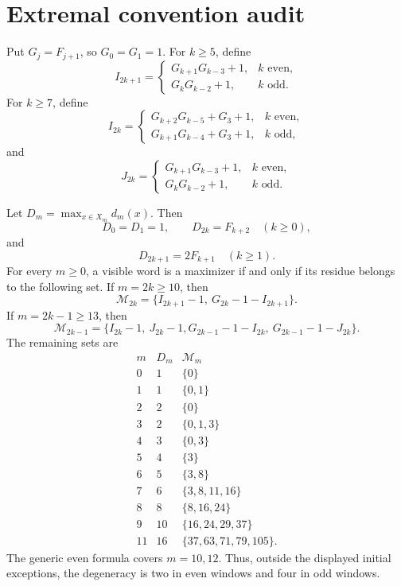 \section{Extremal convention audit}
\label{sec:extremal-audit}

Put \(G_j=F_{j+1}\), so \(G_0=G_1=1\).  For \(k\ge5\), define
\[
 I_{2k+1}=
 \begin{cases}
 G_{k+1}G_{k-3}+1,&k\text{ even},\\
 G_kG_{k-2}+1,&k\text{ odd}.
 \end{cases}
\]
For \(k\ge7\), define
\[
 I_{2k}=
 \begin{cases}
 G_{k+2}G_{k-5}+G_3+1,&k\text{ even},\\
 G_{k+1}G_{k-4}+G_3+1,&k\text{ odd},
 \end{cases}
\]
and
\[
 J_{2k}=
 \begin{cases}
 G_{k+1}G_{k-3}+1,&k\text{ even},\\
 G_kG_{k-2}+1,&k\text{ odd}.
 \end{cases}
\]

\begin{proposition}
\label{prop:extremal-residue-audit}
Let \(D_m=\max_{x\in X_m}d_m(x)\).  Then
\[
 D_0=D_1=1,\qquad D_{2k}=F_{k+2}\quad(k\ge0),
\]
and
\[
 D_{2k+1}=2F_{k+1}\quad(k\ge1).
\]
For every \(m\ge0\), a visible word is a maximizer if and only if its residue
belongs to the following set.  If \(m=2k\ge10\), then
\[
 \mathcal M_{2k}=\{I_{2k+1}-1,\ G_{2k}-1-I_{2k+1}\}.
\]
If \(m=2k-1\ge13\), then
\[
 \mathcal M_{2k-1}=\{I_{2k}-1,\ J_{2k}-1,
 G_{2k-1}-1-I_{2k},\ G_{2k-1}-1-J_{2k}\}.
\]
The remaining sets are
\[
\begin{array}{c|c|l}
m&D_m&\mathcal M_m\\ \hline
0&1&\{0\}\\
1&1&\{0,1\}\\
2&2&\{0\}\\
3&2&\{0,1,3\}\\
4&3&\{0,3\}\\
5&4&\{3\}\\
6&5&\{3,8\}\\
7&6&\{3,8,11,16\}\\
8&8&\{8,16,24\}\\
9&10&\{16,24,29,37\}\\
11&16&\{37,63,71,79,105\}.
\end{array}
\]
The generic even formula covers \(m=10,12\).  Thus, outside the displayed
initial exceptions, the degeneracy is two in even windows and four in odd
windows.
\end{proposition}

